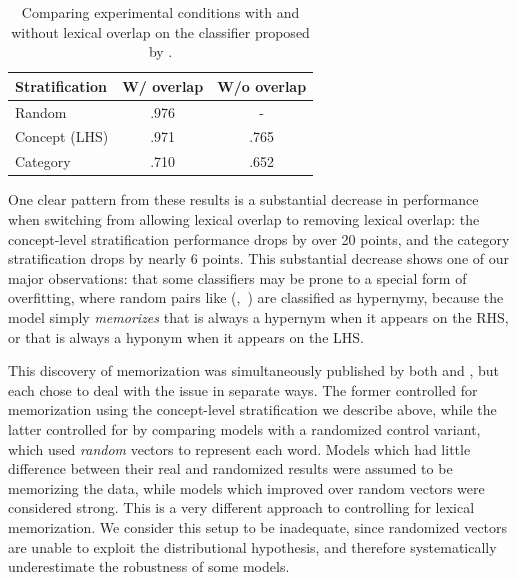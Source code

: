 \begin{table}
  \centering
  \begin{tabular}{|l|c|c|}
      \hline
      {\bf Stratification} & {\bf W/ overlap} & {\bf W/o overlap} \\
      \hline
      \hline
      Random               &   .976           &     -             \\
      Concept (LHS)        &   .971           &   .765            \\
      Category             &   .710           &   .652            \\
      \hline
  \end{tabular}
  \caption{Comparing experimental conditions with and without lexical overlap
    on the classifier proposed by .}
  \label{tab:overlapresults}
\end{table}

One clear pattern from these results is a substantial
decrease in performance when switching from allowing lexical overlap to
removing lexical overlap: the concept-level stratification performance drops
by over 20 points, and the category stratification drops by nearly 6 points.
This substantial decrease shows one of our major observations: that some
classifiers may be prone to a special form of overfitting, where random pairs
like (,~) are classified as hypernymy, because the
model simply {\em memorizes} that  is always a hypernym when it
appears on the RHS, or that  is always a hyponym when it appears
on the LHS.

This discovery of memorization was simultaneously published by both
 and , but each chose to
deal with the issue in separate ways. The former controlled for memorization
using the concept-level stratification we describe above, while the latter
controlled for by comparing models with a randomized control variant, which
used {\em random} vectors to represent each word. Models which had little
difference between their real and randomized results were assumed to be
memorizing the data, while models which improved over random vectors were
considered strong. This is a very different approach to controlling for
lexical memorization. We consider this setup to be inadequate, since
randomized vectors are unable to exploit the distributional hypothesis, and
therefore systematically underestimate the robustness of some models.

